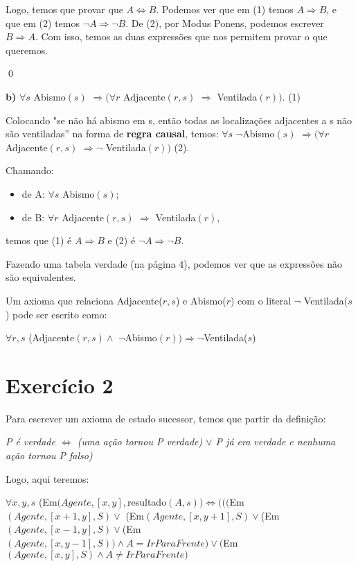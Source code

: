 \documentclass[12pt,letterpaper]{article}
\begin{document}
	Logo, temos que provar que $A \Leftrightarrow B$. Podemos ver que em (1) temos $A \Rightarrow B$, e que em (2) temos $\lnot A \Rightarrow \lnot B$. De (2), por Modus Ponens, podemos escrever $B \Rightarrow A$. Com isso, temos as duas expressões que nos permitem provar o que queremos. 
	
	\qed
	
	\textbf{b)} $\forall s$ Abismo$(s)$ $\Rightarrow (\forall r$ Adjacente$(r, s)$ $\Rightarrow$ Ventilada$(r))$. (1)
	
	Colocando "se não há abismo em s, então todas as localizações adjacentes a s não são ventiladas” na forma de \textbf{regra causal}, temos: $\forall s$ $\lnot$Abismo$(s)$ $\Rightarrow (\forall r$ Adjacente$(r, s)$ $\Rightarrow \lnot$ Ventilada$(r))$ (2).
	
	Chamando: 
	\begin{itemize}
		\item de A: $\forall s$ Abismo$(s)$;
		\item de B: $\forall r$ Adjacente$(r, s)$ $\Rightarrow$ Ventilada$(r)$,
	\end{itemize}
	
	temos que (1) é $A \Rightarrow B$ e (2) é $\lnot A \Rightarrow \lnot B$.
	
	Fazendo uma tabela verdade (na página 4), podemos ver que as expressões não são equivalentes.
	
	Um axioma que relaciona Adjacente($r,s$) e Abismo($r$) com o literal $\lnot$ Ventilada($s$) pode ser escrito como:
	
	\begin{center}
		$\forall r, s$ (Adjacente$(r,s) \land$ $\lnot$Abismo$(r)) \Rightarrow \lnot$Ventilada($s$)
	\end{center}
	
	\section*{Exercício 2}
	
	Para escrever um axioma de estado sucessor, temos que partir da definição:
	
	\begin{center}
		\textit{P é verdade $\Leftrightarrow$ (uma ação tornou P verdade) $\lor$ P já era
		verdade e nenhuma ação tornou P falso)} 
	\end{center}
	
	Logo, aqui teremos: 
	
	$\forall x, y, s$ (Em$(Agente, [x,y], $resultado$(A, s)) \Leftrightarrow ((($Em$(Agente, [x+1,y], S) \lor $ (Em$(Agente, [x,y+1], S) \lor $(Em$(Agente, [x-1,y], S) \lor $(Em$(Agente, [x,y-1], S)) \land A = IrParaFrente) \lor ($Em$(Agente, [x,y], S) \land A \neq IrParaFrente)$\\
	
\end{document}
